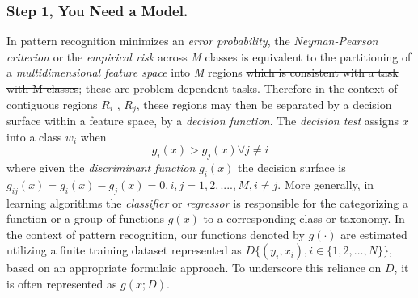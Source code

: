 \documentclass[10pt]{article}[draft]
\begin{document}
\subsubsection*{Step 1, You Need a Model.}
In pattern recognition minimizes an \emph{error probability}, the \emph{Neyman-Pearson criterion} or the \emph{empirical risk} across \emph{M} classes is equivalent to the partitioning of a \emph{multidimensional feature space} into \emph{M} regions \st{which is consistent with a task with {M} classes}; these are problem dependent tasks. Therefore in the context of contiguous regions \(R_i\) , \(R_j\), these regions may then be separated by a decision surface within a feature space, by a \emph{decision function}. The \emph{decision test} assigns \(x\)  into a class  \(w_i\) when
\begin{equation}
g_i(x) > g_j(x) \forall j \neq i
\end{equation}
where given the \emph{discriminant function} \(g_i(x)\) the decision surface is \(g_{ij}(x) = g_i(x) - g_j(x) = 0, i,j=1,2,....,M, i\neq j\). More generally, in learning algorithms the \emph{classifier} or \emph{regressor} is responsible for the categorizing a function or a group of functions \(g(x)\) to a corresponding class or taxonomy. In the context of pattern recognition, our functions denoted by \(g( \cdot )\) are estimated utilizing a finite training dataset represented as \(D \{ (y_i,x_i),i \in \{1,2,\ldots,N\} \}\), based on an appropriate formulaic approach. To underscore this reliance on \(D\), it is often represented as \(g(x; D)\). 
\end{document}
